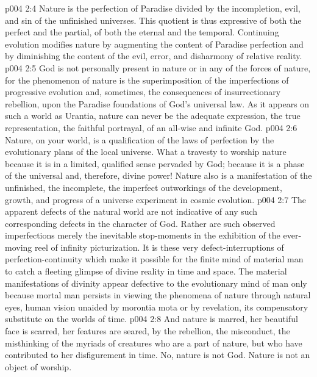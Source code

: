 \vs p004 2:4 Nature is the perfection of Paradise divided by the incompletion, evil, and sin of the unfinished universes. This quotient is thus expressive of both the perfect and the partial, of both the eternal and the temporal. Continuing evolution modifies nature by augmenting the content of Paradise perfection and by diminishing the content of the evil, error, and disharmony of relative reality.
\vs p004 2:5 \pc God is not personally present in nature or in any of the forces of nature, for the phenomenon of nature is the superimposition of the imperfections of progressive evolution and, sometimes, the consequences of insurrectionary rebellion, upon the Paradise foundations of God’s universal law. As it appears on such a world as Urantia, nature can never be the adequate expression, the true representation, the faithful portrayal, of an all\hyp{}wise and infinite God.
\vs p004 2:6 Nature, on your world, is a qualification of the laws of perfection by the evolutionary plans of the local universe. What a travesty to worship nature because it is in a limited, qualified sense pervaded by God; because it is a phase of the universal and, therefore, divine power! Nature also is a manifestation of the unfinished, the incomplete, the imperfect outworkings of the development, growth, and progress of a universe experiment in cosmic evolution.
\vs p004 2:7 The apparent defects of the natural world are not indicative of any such corresponding defects in the character of God. Rather are such observed imperfections merely the inevitable stop\hyp{}moments in the exhibition of the ever\hyp{}moving reel of infinity picturization. It is these very defect\hyp{}interruptions of perfection\hyp{}continuity which make it possible for the finite mind of material man to catch a fleeting glimpse of divine reality in time and space. The material manifestations of divinity appear defective to the evolutionary mind of man only because mortal man persists in viewing the phenomena of nature through natural eyes, human vision unaided by morontia mota or by revelation, its compensatory substitute on the worlds of time.
\vs p004 2:8 And nature is marred, her beautiful face is scarred, her features are seared, by the rebellion, the misconduct, the misthinking of the myriads of creatures who are a part of nature, but who have contributed to her disfigurement in time. No, nature is not God. Nature is not an object of worship.
